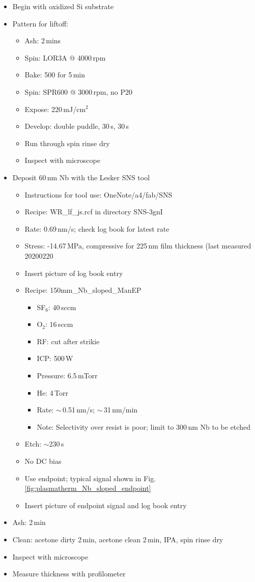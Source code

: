 \begin{itemize}
\item Begin with oxidized Si substrate
\item Pattern for liftoff:
\begin{itemize}
\item Ash: 2\,mins
\item Spin: LOR3A @ 4000\,rpm
\item Bake: 500\textcelsius\,\,for 5\,min
\item Spin: SPR600 @ 3000\,rpm, no P20
\item Expose: 220\,mJ/cm$^2$
\item Develop: double puddle, 30\,s, 30\,s
\item Run through spin rinse dry
\item Inspect with microscope
\end{itemize}
\item Deposit 60\,nm Nb with the Lesker SNS tool
\begin{itemize}
\item Instructions for tool use: OneNote/a4/fab/SNS
\item Recipe:  WR\_lf\_js.rcf in directory SNS-3gnI
\item Rate: 0.69\,nm/s; check log book for latest rate
\item Stress: -14.67\,MPa, compressive for 225\,nm film thickness (last measured 20200220
\item Insert picture of log book entry
\end{itemize}
\begin{itemize}




\item Recipe: 150mm\_Nb\_sloped\_ManEP
\begin{itemize}
\item SF$_6$: 40\,sccm
\item O$_2$: 16\,sccm
\item RF: cut after strikie
\item ICP: 500\,W
\item Pressure: 6.5\,mTorr
\item He: 4\,Torr
\item Rate: $\sim$\,0.51\,nm/s; $\sim$\,31\,nm/min
\item Note: Selectivity over resist is poor; limit to 300\,nm Nb to be etched
\end{itemize}
\item Etch: $\sim$230\,s
\item No DC bias
\item Use endpoint; typical signal shown in Fig.\,\ref{fig:plasmatherm_Nb_sloped_endpoint}
\item Insert picture of endpoint signal and log book entry
\end{itemize}
\item Ash: 2\,min
\item Clean: acetone dirty 2\,min, acetone clean 2\,min, IPA, spin rinse dry
\item Inspect with microscope
\item Measure thickness with profilometer
\end{itemize}




